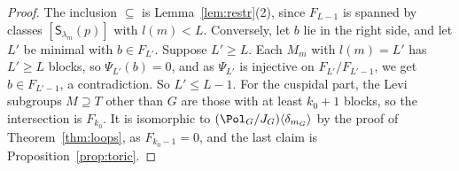 \documentclass[11pt]{amsart}
\begin{document}
\begin{proof}
The inclusion $\subseteq$ is Lemma~\ref{lem:restr}(2), since $F_{L-1}$ is
spanned by classes $[\mathsf S_{\lambda_m}(p)]$ with $l(m)<L$.  Conversely, let
$b$ lie in the right side, and let $L'$ be minimal with $b\in F_{L'}$.
Suppose $L'\ge L$.  Each $M_m$ with $l(m)=L'$ has $L'\ge L$ blocks, so
$\Psi_{L'}(b)=0$, and as $\Psi_{L'}$ is injective on $F_{L'}/F_{L'-1}$, we get
$b\in F_{L'-1}$, a contradiction.  So $L'\le L-1$.  For the cuspidal part,
the Levi subgroups $M\supseteq T$ other than $G$ are those with at least
$k_0+1$ blocks, so the intersection is $F_{k_0}$.  It is isomorphic to
$(\Pol_G/J_G)\langle\delta_{m_G}\rangle$ by the proof of Theorem~\ref{thm:loops}, as
$F_{k_0-1}=0$, and the last claim is Proposition~\ref{prop:toric}.
\end{proof}
\end{document}
